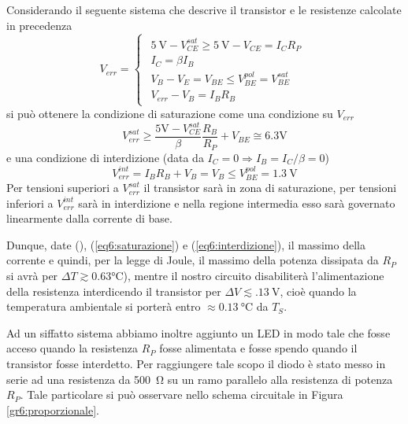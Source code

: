 Considerando il seguente sistema che descrive il transistor e le resistenze calcolate in precedenza
$$
V_{err} = \begin{cases}
\begin{array}{rl}
\SI{5}{\volt}-V_{CE}^{sat} \geq \SI{5}{\volt}-V_{CE} = I_{C}R_P\\
I_C=\beta I_B \\
V_B - V_E = V_{BE} \leq V_{BE}^{pol} = V_{BE}^{sat}\\
V_{err}-V_B=I_B R_B
\end{array}
\end{cases}
$$
si può ottenere la condizione di saturazione come una condizione su $V_{err}$
\begin{equation}
V_{err}^{sat} \geq \frac{5\si{\volt}-V_{CE}^{sat}}{\beta} \frac{R_B}{R_P}+V_{BE} \cong 6.3 \si{\volt}
\label{eq6:saturazione}
\end{equation}
e una condizione di interdizione (data da $I_C = 0 \Rightarrow I_B = I_C / \beta = 0$)
\begin{equation}
V_{err}^{int} = I_B R_B + V_B = V_B \leq V_{BE}^{pol} = \SI{1.3}{\V}
\label{eq6:interdizione}
\end{equation}
Per tensioni superiori a $V_{err}^{sat}$ il transistor sarà in zona di saturazione, per tensioni inferiori a $V_{err}^{int}$ sarà in interdizione e nella regione intermedia esso sarà governato linearmente dalla corrente di base.

Dunque, date (\label{eq6:exit_opamp}), (\ref{eq6:saturazione}) e (\ref{eq6:interdizione}), il massimo della corrente e quindi, per la legge di Joule, il massimo della potenza dissipata da $R_P$ si avrà per $\Delta T \gtrsim 0.63 \si{\celsius}$), mentre il nostro circuito disabiliterà l'alimentazione della resistenza interdicendo il transistor per $\Delta V \lesssim \SI{.13}{\V}$, cioè quando la temperatura ambientale si porterà entro $\approx \SI{0.13}{\celsius}$ da $T_{S}$.


Ad un siffatto sistema abbiamo inoltre aggiunto un LED in modo tale che fosse acceso quando la resistenza $R_P$ fosse alimentata e fosse spendo quando il transistor fosse interdetto.
Per raggiungere tale scopo il diodo è stato messo in serie ad una resistenza da \SI{500}{\ohm} su un ramo parallelo alla resistenza di potenza $R_P$.
Tale particolare si può osservare nello schema circuitale in Figura \ref{gr6:proporzionale}.

